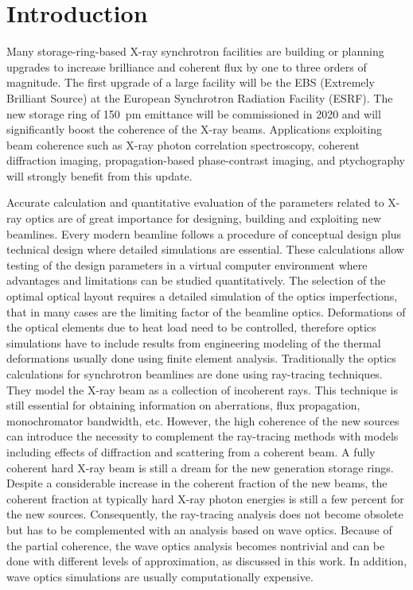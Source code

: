 \documentclass{iucr}              %
\begin{document}
\section{Introduction}

Many storage-ring-based X-ray synchrotron facilities are building or planning upgrades to increase brilliance and coherent flux by one to three orders of magnitude.  The first upgrade of a large facility will be the EBS (Extremely Brilliant Source) \cite{orangebook} at the European Synchrotron Radiation Facility (ESRF). The new storage ring of 150~pm emittance will be commissioned in 2020 and will significantly boost the coherence of the X-ray beams. Applications exploiting beam coherence such as X-ray photon correlation spectroscopy, coherent diffraction imaging, propagation-based phase-contrast imaging, and ptychography will strongly benefit from this update.  

Accurate calculation and quantitative evaluation of the parameters related to X-ray optics are of great importance for designing, building and exploiting new beamlines. Every modern beamline follows a procedure of conceptual design plus technical design where detailed simulations are essential. These calculations allow testing of the design parameters in a virtual computer environment where advantages and limitations can be studied quantitatively. The selection of the optimal optical layout requires a detailed simulation of the optics imperfections, that in many cases are the limiting factor of the beamline optics. Deformations of the optical elements due to heat load need to be controlled, therefore optics simulations have to include results from engineering modeling of the thermal deformations usually done using finite element analysis. Traditionally the optics calculations for synchrotron beamlines are done using ray-tracing techniques. They model the X-ray beam as a collection of incoherent rays. This technique is still essential for obtaining information on aberrations, flux propagation, monochromator bandwidth, etc. However, the high coherence of the new sources can introduce the necessity to complement the ray-tracing methods with models including effects of diffraction and scattering from a coherent beam. A fully coherent hard X-ray beam is still a dream for the new generation storage rings. Despite a considerable increase in the coherent fraction of the new beams, the coherent fraction at typically hard X-ray photon energies is still a few percent for the new sources. Consequently, the ray-tracing analysis does not become obsolete but has to be complemented with an analysis based on wave optics. Because of the partial coherence, the wave optics analysis becomes nontrivial and can be done with different levels of approximation, as discussed in this work. In addition, wave optics simulations are usually computationally expensive.
\end{document}
